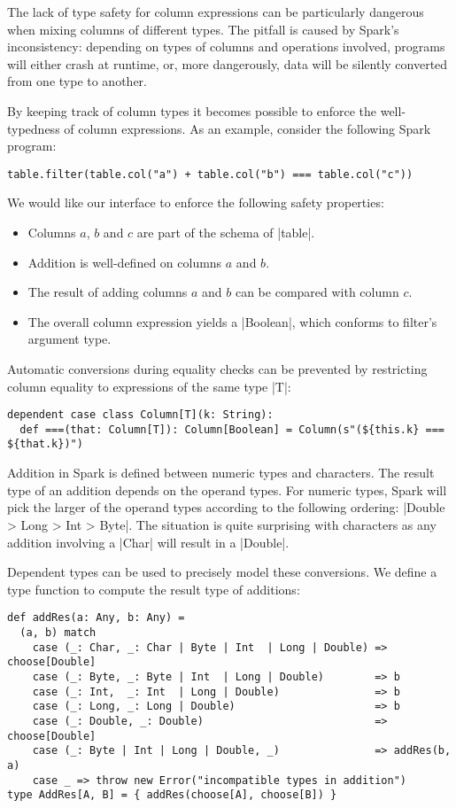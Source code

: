 The lack of type safety for column expressions can be particularly dangerous when mixing columns of different types.
The pitfall is caused by Spark's inconsistency: depending on types of columns and operations involved, programs will either crash at runtime, or, more dangerously, data will be silently converted from one type to another.

By keeping track of column types it becomes possible to enforce the well-typedness of column expressions.
As an example, consider the following Spark program:

\begin{lstlisting}
table.filter(table.col("a") + table.col("b") === table.col("c"))
\end{lstlisting}

We would like our interface to enforce the following safety properties:

\begin{itemize}
\item
  Columns $a$, $b$ and $c$ are part of the schema of
  |table|.
\item
  Addition is well-defined on columns $a$ and $b$.
\item
  The result of adding columns $a$ and $b$ can be compared with
  column $c$.
\item
  The overall column expression yields a |Boolean|, which
  conforms to filter's argument type.
\end{itemize}

Automatic conversions during equality checks can be prevented by restricting column equality to expressions of the same type |T|:

\begin{lstlisting}
dependent case class Column[T](k: String):
  def ===(that: Column[T]): Column[Boolean] = Column(s"(${this.k} === ${that.k})")
\end{lstlisting}

Addition in Spark is defined between numeric types and characters.
The result type of an addition depends on the operand types.
For numeric types, Spark will pick the larger of the operand types according to the following ordering: |Double > Long > Int > Byte|.
The situation is quite surprising with characters as any addition involving a |Char| will result in a |Double|.

Dependent types can be used to precisely model these conversions.
We define a type function to compute the result type of additions:

\begin{lstlisting}
def addRes(a: Any, b: Any) =
  (a, b) match
    case (_: Char, _: Char | Byte | Int  | Long | Double) => choose[Double]
    case (_: Byte, _: Byte | Int  | Long | Double)        => b
    case (_: Int,  _: Int  | Long | Double)               => b
    case (_: Long, _: Long | Double)                      => b
    case (_: Double, _: Double)                           => choose[Double]
    case (_: Byte | Int | Long | Double, _)               => addRes(b, a)
    case _ => throw new Error("incompatible types in addition")
type AddRes[A, B] = { addRes(choose[A], choose[B]) }
\end{lstlisting}

